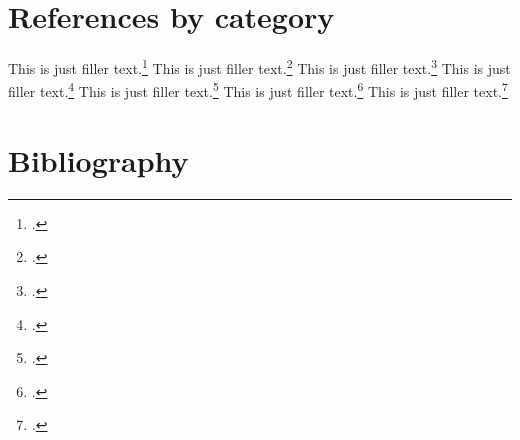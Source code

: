 \documentclass[a4paper,oneside]{book}
\begin{document}
\chapter{References by category}

This is just filler text.\footcite{aristotle:anima}
This is just filler text.\footcite{nussbaum}
This is just filler text.\footcite{averroes/bland}
This is just filler text.\footcite{hyman}
This is just filler text.\footcite{aristotle:physics}
This is just filler text.\footcite{moraux}
This is just filler text.\footcite{pines}

\chapter*{Bibliography}
\bibbycategory
%
%
\end{document}
